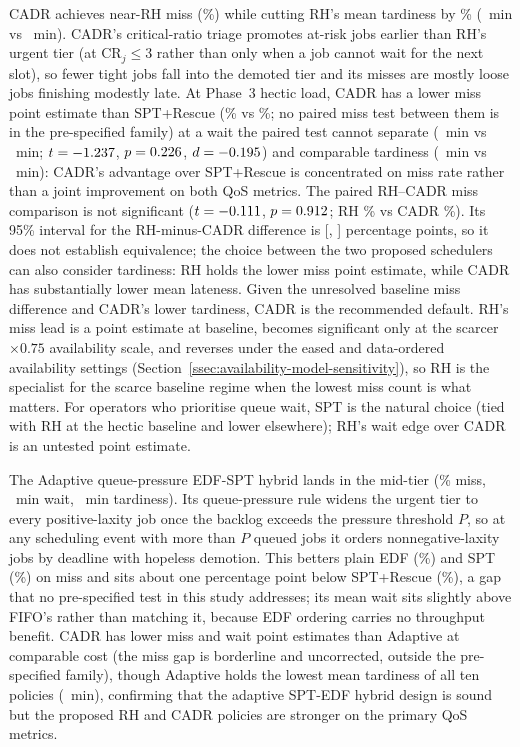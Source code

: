 {CADR achieves near-RH miss (\CADRmiss\%) while cutting RH's mean tardiness by \CADRtardReduction\% (\CADRtard~min vs \RHtard~min). CADR's critical-ratio triage promotes at-risk jobs earlier than RH's urgent tier (at $\mathrm{CR}_j \leq 3$ rather than only when a job cannot wait for the next slot), so fewer tight jobs fall into the demoted tier and its misses are mostly loose jobs finishing modestly late. At Phase~3 hectic load, CADR has a lower miss point estimate than SPT+Rescue (\CADRmiss\% vs \RescueMiss\%; no paired miss test between them is in the pre-specified family) at a wait the paired test cannot separate (\CADRwait~min vs \RescueWait~min; $t=-1.237$, $p=0.226$, $d=-0.195$) and comparable tardiness (\CADRtard~min vs \RescueTard~min): CADR's advantage over SPT+Rescue is concentrated on miss rate rather than a joint improvement on both QoS metrics. The paired RH--CADR miss comparison is not significant ($t=-0.111$, $p=0.912$; RH \RHMiss\% vs CADR \CADRmiss\%). Its 95\% interval for the RH-minus-CADR difference is [\RHCADRmissMDLo, \RHCADRmissMDHi] percentage points, so it does not establish equivalence; the choice between the two proposed schedulers can also consider tardiness: RH holds the lower miss point estimate, while CADR has substantially lower mean lateness. Given the unresolved baseline miss difference and CADR's lower tardiness, CADR is the recommended default. RH's miss lead is a point estimate at baseline, becomes significant only at the scarcer $\times 0.75$ availability scale, and reverses under the eased and data-ordered availability settings (Section~\ref{ssec:availability-model-sensitivity}), so RH is the specialist for the scarce baseline regime when the lowest miss count is what matters. For operators who prioritise queue wait, SPT is the natural choice (tied with RH at the hectic baseline and lower elsewhere); RH's wait edge over CADR is an untested point estimate.

The Adaptive queue-pressure EDF-SPT hybrid lands in the mid-tier (\AdaptiveMiss\% miss, \AdaptiveWait~min wait, \AdaptiveTard~min tardiness). Its queue-pressure rule widens the urgent tier to every positive-laxity job once the backlog exceeds the pressure threshold $P$, so at any scheduling event with more than $P$ queued jobs it orders nonnegative-laxity jobs by deadline with hopeless demotion. This betters plain EDF (\EDFmiss\%) and SPT (\SPTmiss\%) on miss and sits about one percentage point below SPT+Rescue (\RescueMiss\%), a gap that no pre-specified test in this study addresses; its mean wait sits slightly above FIFO's rather than matching it, because EDF ordering carries no throughput benefit. CADR has lower miss and wait point estimates than Adaptive at comparable cost (the miss gap is borderline and uncorrected, outside the pre-specified family), though Adaptive holds the lowest mean tardiness of all ten policies (\AdaptiveTard~min), confirming that the adaptive SPT-EDF hybrid design is sound but the proposed RH and CADR policies are stronger on the primary QoS metrics.

}
